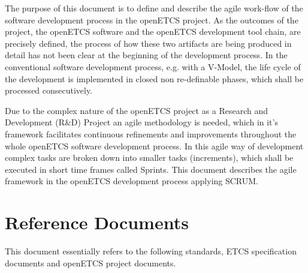The purpose of this document is to define and describe the agile work-flow of the software development process in the openETCS project. As the outcomes of the project, the openETCS software and the openETCS development tool chain, are precisely defined, the process of how these two artifacts are being produced in detail has not been clear at the beginning of the development process. In the conventional software development  process, e.g. with a V-Model, the life cycle of the development is implemented in closed non re-definable phases, which shall be processed consecutively. 

Due to the complex nature of the openETCS project as a  Research and Development (R\&D) Project an agile methodology is needed, which in it's framework facilitates continuous refinements and improvements throughout the whole openETCS software development process. In this agile way of development complex tasks are broken down into smaller tasks (increments), which shall be executed in short time frames called Sprints. This document describes the agile framework in the openETCS development process applying SCRUM.








\section{Reference Documents}
\label{sec:refdoc}

This document essentially refers to the following standards, ETCS specification documents and openETCS project documents.

